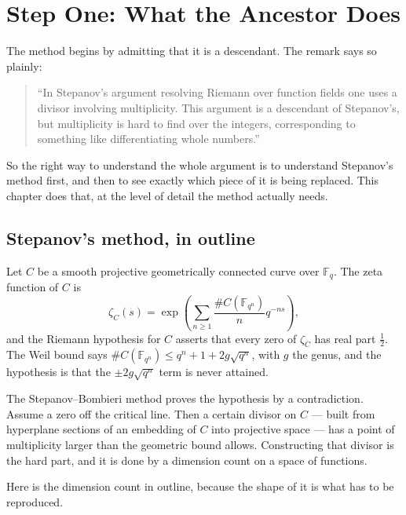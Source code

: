 
\chapter{Step One: What the Ancestor Does}
\label{ch:step1}

The method begins by admitting that it is a descendant. The remark says so
plainly:

\begin{quote}
\small
``In Stepanov's argument resolving Riemann over function fields one uses a
divisor involving multiplicity. This argument is a descendant of Stepanov's, but
multiplicity is hard to find over the integers, corresponding to something like
differentiating whole numbers.''
\end{quote}

So the right way to understand the whole argument is to understand Stepanov's
method first, and then to see exactly which piece of it is being replaced. This
chapter does that, at the level of detail the method actually needs.

\section{Stepanov's method, in outline}Let $C$ be a smooth projective geometrically connected curve over $\mathbb{F}_q$.
The zeta function of $C$ is
\begin{equation}
\zeta_C(s) = \exp\left(\sum_{n \ge 1} \frac{\#C(\mathbb{F}_{q^n})}{n} q^{-ns}\right),
\end{equation}
and the Riemann hypothesis for $C$ asserts that every zero of $\zeta_C$ has real
part $\tfrac12$. The Weil bound says $\#C(\mathbb{F}_{q^n}) \le q^n + 1 + 2g\sqrt{q^n}$,
with $g$ the genus, and the hypothesis is that the $\pm 2g\sqrt{q^n}$ term is
never attained.

The Stepanov--Bombieri method proves the hypothesis by a contradiction. Assume a
zero off the critical line. Then a certain divisor on $C$ --- built from
hyperplane sections of an embedding of $C$ into projective space --- has a point
of multiplicity larger than the geometric bound allows. Constructing that
divisor is the hard part, and it is done by a dimension count on a space of
functions.

Here is the dimension count in outline, because the shape of it is what has to
be reproduced.

